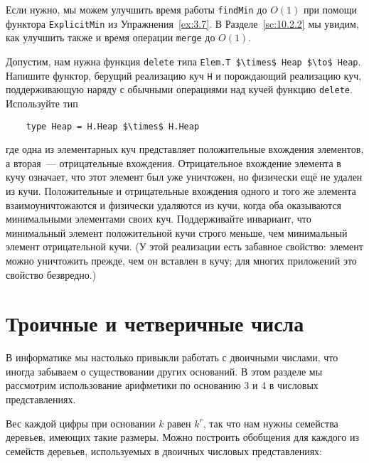 Если нужно, мы можем улучшить время работы \lstinline!findMin! до
$O(1)$ при помощи функтора \lstinline!ExplicitMin! из
Упражнения~\ref{ex:3.7}. В Разделе~\ref{sc:10.2.2} мы увидим, как
улучшить также и время операции \lstinline!merge! до $O(1)$.

\begin{exercise}\label{ex:9.16}
  Допустим, нам нужна функция \lstinline!delete! типа
  \lstinline!Elem.T $\times$ Heap $\to$ Heap!.
  Напишите функтор, берущий реализацию куч \lstinline!H! и порождающий
  реализацию куч, поддерживающую наряду с обычными операциями над
  кучей функцию \lstinline!delete!. Используйте тип
  \begin{lstlisting}
    type Heap = H.Heap $\times$ H.Heap
  \end{lstlisting}
  где одна из элементарных куч представляет положительные вхождения
  элементов, а вторая~--- отрицательные вхождения. Отрицательное
  вхождение элемента в кучу означает, что этот элемент был уже
  уничтожен, но физически ещё не удален из кучи.  Положительные и
  отрицательные вхождения одного и того же элемента
  взаимоуничтожаются и физически удаляются из кучи, когда оба
  оказываются минимальными элементами своих куч.  Поддерживайте
  инвариант, что минимальный элемент положительной кучи строго меньше,
  чем минимальный элемент отрицательной кучи. (У этой реализации есть
  забавное свойство: элемент можно уничтожить прежде, чем он
  вставлен в кучу; для многих приложений это свойство безвредно.)
\end{exercise}

\section{Троичные и четверичные числа}
\label{sc:9.4}

В информатике мы настолько привыкли работать с двоичными числами, что
иногда забываем о существовании других оснований. В этом разделе мы
рассмотрим использование арифметики по основанию 3 и 4 в числовых
представлениях.

Вес каждой цифры при основании $k$ равен $k^r$, так что нам нужны
семейства деревьев, имеющих такие размеры. Можно построить обобщения
для каждого из семейств деревьев, используемых в двоичных числовых
представлениях:

